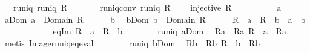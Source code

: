 \begin{isabellebody}
\ \ \ runiq{\isacharcolon}\ {\isachardoublequoteopen}runiq\ R{\isachardoublequoteclose}\isanewline
\ \ \ \ \ \ \ runiq{\isacharunderscore}conv{\isacharcolon}\ {\isachardoublequoteopen}runiq\ {\isacharparenleft}R\ {\isasyminverse}{\isacharparenright}{\isachardoublequoteclose}\isanewline
\ \ \ {\isachardoublequoteopen}injective\ R{\isachardoublequoteclose}\isanewline
%
\isadelimproof
%
\endisadelimproof
%
\isatagproof
{}\isamarkupfalse%
\ {\isacharminus}\isanewline
\ \ \isacommand{{\isacharbraceleft}}\isamarkupfalse%
\isanewline
\ \ \ \ \isamarkupfalse%
\ a\ \isamarkupfalse%
\ a{\isacharunderscore}Dom{\isacharcolon}\ {\isachardoublequoteopen}a\ {\isasymin}\ Domain\ R{\isachardoublequoteclose}\isanewline
\ \ \ \ \isamarkupfalse%
\ b\ \isamarkupfalse%
\ b{\isacharunderscore}Dom{\isacharcolon}\ {\isachardoublequoteopen}b\ {\isasymin}\ Domain\ R{\isachardoublequoteclose}\isanewline
\ \ \ \ \isamarkupfalse%
\ {\isachardoublequoteopen}R\ {\isacharbackquote}{\isacharbackquote}\ {\isacharbraceleft}a{\isacharbraceright}\ {\isacharequal}\ R\ {\isacharbackquote}{\isacharbackquote}\ {\isacharbraceleft}b{\isacharbraceright}\ {\isasymlongrightarrow}\ a\ {\isacharequal}\ b{\isachardoublequoteclose}\isanewline
\ \ \ \ \isamarkupfalse%
\isanewline
\ \ \ \ \ \ \isamarkupfalse%
\ eq{\isacharunderscore}Im{\isacharcolon}\ {\isachardoublequoteopen}R\ {\isacharbackquote}{\isacharbackquote}\ {\isacharbraceleft}a{\isacharbraceright}\ {\isacharequal}\ R\ {\isacharbackquote}{\isacharbackquote}\ {\isacharbraceleft}b{\isacharbraceright}{\isachardoublequoteclose}\isanewline
\ \ \ \ \ \ \isamarkupfalse%
\ runiq\ a{\isacharunderscore}Dom\ \isamarkupfalse%
\ Ra\ \ Ra{\isacharcolon}\ {\isachardoublequoteopen}R\ {\isacharbackquote}{\isacharbackquote}\ {\isacharbraceleft}a{\isacharbraceright}\ {\isacharequal}\ {\isacharbraceleft}Ra{\isacharbraceright}{\isachardoublequoteclose}\ \isamarkupfalse%
\ {\isacharparenleft}metis\ Image{\isacharunderscore}runiq{\isacharunderscore}eq{\isacharunderscore}eval{\isacharparenright}\isanewline
\ \ \ \ \ \ \isamarkupfalse%
\ runiq\ b{\isacharunderscore}Dom\ \isamarkupfalse%
\ Rb\ \ Rb{\isacharcolon}\ {\isachardoublequoteopen}R\ {\isacharbackquote}{\isacharbackquote}\ {\isacharbraceleft}b{\isacharbraceright}\ {\isacharequal}\ {\isacharbraceleft}Rb{\isacharbraceright}{\isachardoublequoteclose}\ \isamarkupfalse%

\end{isabellebody}
